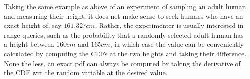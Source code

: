 \begin{enumerate}[5a.]
	Taking the same example as above of an experiment of sampling an adult human and measuring their height, it does not make sense to seek humans who have an exact height of, say $161.327cm$. Rather, the experimenter is usually interested in range queries, such as the probability that a randomly selected adult human has a height between $160cm$ and $165cm$, in which case the value can be conveniently calculated by computing the CDFs at the two heights and taking their difference. None the less, an exact pdf can always be computed by taking the derivative of the CDF wrt the random variable at the desired value.
\end{enumerate}